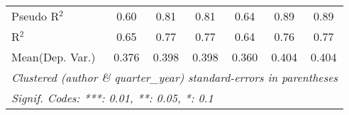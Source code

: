 \begin{tabular}{lcccccc}
   Pseudo R$^2$                   & 0.60           & 0.81           & 0.81           & 0.64           & 0.89         & 0.89\\  
   R$^2$                          & 0.65           & 0.77           & 0.77           & 0.64           & 0.76         & 0.77\\  
Mean(Dep. Var.) & 0.376 & 0.398 & 0.398 & 0.360 & 0.404 & 0.404 \\
   \midrule \midrule
   \multicolumn{7}{l}{\emph{Clustered (author \& quarter\_year) standard-errors in parentheses}}\\
   \multicolumn{7}{l}{\emph{Signif. Codes: ***: 0.01, **: 0.05, *: 0.1}}\\
\end{tabular}
\par\endgroup
